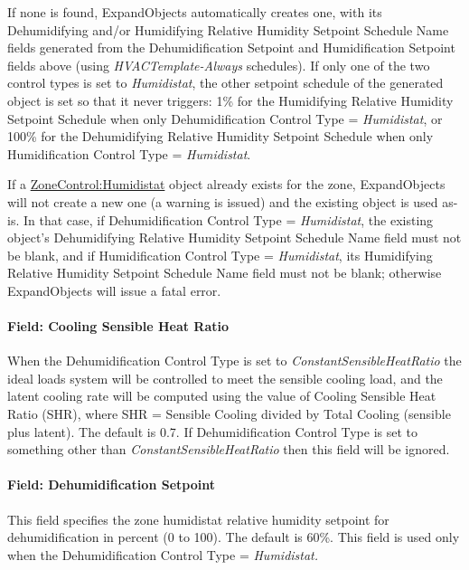 If none is found, ExpandObjects automatically creates one, with its Dehumidifying and/or Humidifying Relative Humidity Setpoint Schedule Name fields generated from the Dehumidification Setpoint and Humidification Setpoint fields above (using \emph{HVACTemplate-Always} schedules).
If only one of the two control types is set to \emph{Humidistat}, the other setpoint schedule of the generated object is set so that it never triggers: 1\% for the Humidifying Relative Humidity Setpoint Schedule when only Dehumidification Control Type = \emph{Humidistat}, or 100\% for the Dehumidifying Relative Humidity Setpoint Schedule when only Humidification Control Type = \emph{Humidistat}.

If a \hyperref[zonecontrolhumidistat]{ZoneControl:Humidistat} object already exists for the zone, ExpandObjects will not create a new one (a warning is issued) and the existing object is used as-is. In that case, if Dehumidification Control Type = \emph{Humidistat}, the existing object's Dehumidifying Relative Humidity Setpoint Schedule Name field must not be blank, and if Humidification Control Type = \emph{Humidistat}, its Humidifying Relative Humidity Setpoint Schedule Name field must not be blank; otherwise ExpandObjects will issue a fatal error.


\paragraph{Field: Cooling Sensible Heat Ratio}\label{field-cooling-sensible-heat-ratio}

When the Dehumidification Control Type is set to \emph{ConstantSensibleHeatRatio} the ideal loads system will be controlled to meet the sensible cooling load, and the latent cooling rate will be computed using the value of Cooling Sensible Heat Ratio (SHR), where SHR = Sensible Cooling divided by Total Cooling (sensible plus latent). The default is 0.7. If Dehumidification Control Type is set to something other than \emph{ConstantSensibleHeatRatio} then this field will be ignored.

\paragraph{Field: Dehumidification Setpoint}\label{field-dehumidification-setpoint}

This field specifies the zone humidistat relative humidity setpoint for dehumidification in percent (0 to 100). The default is 60\%. This field is used only when the Dehumidification Control Type = \emph{Humidistat.}


